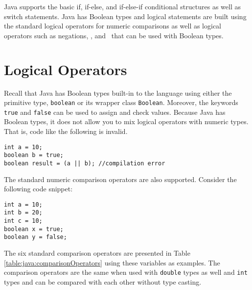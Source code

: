 

Java supports the basic if, if-else, and if-else-if conditional structures as well as switch
statements.  Java has Boolean types and logical statements are built using the standard 
logical operators for numeric comparisons as well as logical operators such as negations, 
\And, and \Or\ that can be used with Boolean types.

\section{Logical Operators}

Recall that Java has Boolean types built-in to the language using
either the primitive type, \texttt{boolean} or its wrapper class
\texttt{Boolean}.  Moreover, the keywords \texttt{true}
and \texttt{false} can be used to assign and check values.
Because Java has Boolean types, it does not allow you to mix logical operators
with numeric types.  That is, code like the following is invalid.

\begin{verbatim}
int a = 10;
boolean b = true;
boolean result = (a || b); //compilation error
\end{verbatim}

The standard numeric comparison operators are also supported.  Consider the 
following code snippet:

\begin{verbatim}
int a = 10;
int b = 20;
int c = 10;
boolean x = true;
boolean y = false;
\end{verbatim}

The six standard comparison operators are presented in Table \ref{table:java:comparisonOperators}
using these variables as examples.  The comparison operators are the same when
used with \texttt{double} types as well and \texttt{int} types and can be compared with each other without type casting.

